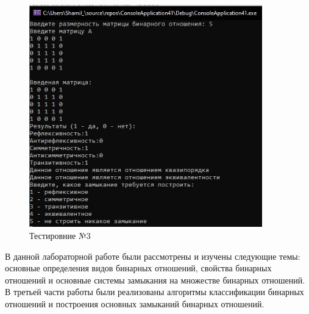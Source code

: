 \documentclass[bachelor, och, labwork]{shiza}
\begin{document}
	
	\begin{figure}[H]
		\centering
		\includegraphics[width=0.9\textwidth]{test3}
		\caption{Тестировние №3}
		\label{fig:test3}
	\end{figure}
	
	\newpage
	\conclusion %
	
	В данной лабораторной работе были рассмотрены и изучены следующие темы: основные определения видов бинарных отношений, свойства бинарных отношений и основные системы замыкания на множестве бинарных отношений. В третьей части работы были реализованы алгоритмы классификации бинарных отношений и построения основных замыканий бинарных отношений.
	
	
\end{document}
